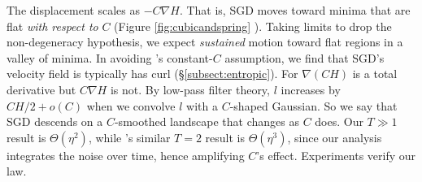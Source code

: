 \documentclass[anon,12pt]{colt2021} %
\newcommand{\offive}[1]{
    {\tiny
        \raisebox{-0.04cm}{\color{gray}\scalebox{2.5}{$\substack{
            \ifthenelse{\equal{#1}{0}}{{\color{moor}\blacksquare}}{\square} 
        }$}}%
        \raisebox{0.04cm}{$\substack{
            \IfSubStr{#1}{1}{{\color{moor}\blacksquare}}{\square}   
            \IfSubStr{#1}{1}{{\color{moor}\blacksquare}}{\square} \\
            \IfSubStr{#1}{2}{{\color{moor}\blacksquare}}{\square}    
            \IfSubStr{#1}{2}{{\color{moor}\blacksquare}}{\square}    
        }$}%
    }%
}
\newcommand{\sizeddia}[2]{%
    \begin{gathered}%
        \texttt{[image: ../diagrams/\#1.png]}%
    \end{gathered}%
}
\newcommand{\sdia}[1]{\protect \sizeddia{#1}{0.10}}
\begin{document}
            The displacement scales as $-C\nabla H$.
            That is, SGD moves toward minima that are flat \emph{with respect
            to} $C$ (Figure
            \ref{fig:cubicandspring}\offive{0}).
            Taking limits to drop the non-degeneracy hypothesis, we expect
            \emph{sustained} motion toward flat regions in a valley of minima.
            In avoiding \cite{we19b}'s constant-$C$ assumption, we find that
            SGD's velocity field is typically has curl
            (\S\ref{subsect:entropic}).  For $\nabla(CH)$ is a total
            derivative but $C\nabla H$ is not.  By low-pass filter theory, $l$
            increases by $CH/2+o(C)$ when we convolve $l$ with a $C$-shaped
            Gaussian.  So we say that SGD descends on a $C$-smoothed landscape
            that changes as $C$ does.
            Our $T\gg 1$ result is $\Theta(\eta^2)$, while \cite{ya19b}'s
            similar $T=2$ result is $\Theta(\eta^3)$, since our analysis
            integrates the noise over time, hence amplifying $C$'s
            effect.  Experiments verify our law.
      
\end{document}
